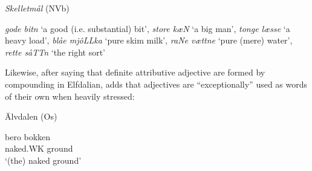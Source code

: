 
\item 

\textit{Skelletmål} (NVb)



\textit{gode bitn} ‘a good (i.e. substantial) bit’, \textit{store k}\textit{æ}\textit{N} ‘a big man’,\textit{ tonge læsse} ‘a heavy load’, \textit{blåe mjôLLka} ‘pure skim milk’, \textit{raNe vættne} ‘pure (mere) water’, \textit{rette såTTn }‘the right sort’


Likewise, after saying that definite attributive adjective are formed by compounding in Elfdalian, \citet[53]{Levander1909} adds that adjectives are “exceptionally” used as words of their own when heavily stressed:


\item 

\label{bkm:Ref155246246}Älvdalen (Os)



\item 


 \ea\label{}
\gll bero  bokken\\


naked.WK  ground\\

\glt ‘(the) naked ground’

\z

